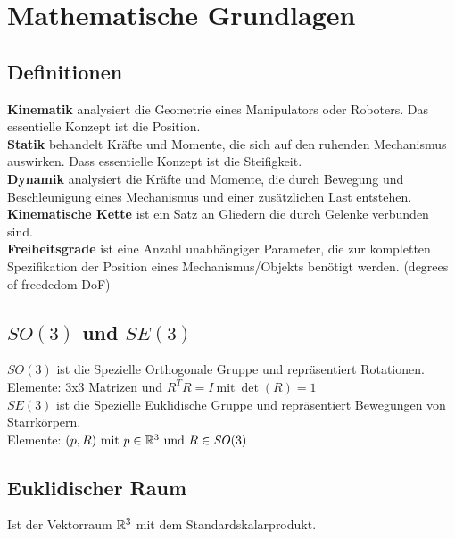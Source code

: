 

\section{Mathematische Grundlagen}

\newcommand{\SO}{\ensuremath{\mathit{SO}(3)}\xspace}
\newcommand{\SE}{\ensuremath{\mathit{SE}(3)}\xspace}
\newcommand{\myMatrix}[1]{\ensuremath{\begin{pmatrix}#1\end{pmatrix}}}
\newcommand{\myVector}[1]{\ensuremath{\begin{pmatrix}#1\end{pmatrix}}}

\subsection{Definitionen}
\textbf{Kinematik} analysiert die Geometrie eines Manipulators oder Roboters. Das essentielle Konzept ist die Position.\\
\textbf{Statik} behandelt Kräfte und Momente, die sich auf den ruhenden Mechanismus auswirken. Dass essentielle Konzept
ist die Steifigkeit.\\
\textbf{Dynamik} analysiert die Kräfte und Momente, die durch Bewegung und Beschleunigung eines Mechanismus und einer
zusätzlichen Last entstehen.\\
\textbf{Kinematische Kette} ist ein Satz an Gliedern die durch Gelenke verbunden sind.\\
\textbf{Freiheitsgrade} ist eine Anzahl unabhängiger Parameter, die zur kompletten Spezifikation der Position eines
Mechanismus/Objekts benötigt werden. (degrees of freededom DoF)

\subsection{\SO und \SE}
\SO ist die Spezielle Orthogonale Gruppe und repräsentiert Rotationen.\\
Elemente: 3x3 Matrizen und \(R^TR = I\ \text{mit}\ \det(R) = 1\)\\
\SE ist die Spezielle Euklidische Gruppe und repräsentiert Bewegungen von Starrkörpern.\\
Elemente: \((p, R)\ \text{mit}\ p \in \realnumbers^3\ \text{und}\ R \in \SO\)

\subsection{Euklidischer Raum}
Ist der Vektorraum \(\mathbb{R}^3\) mit dem Standardskalarprodukt.

